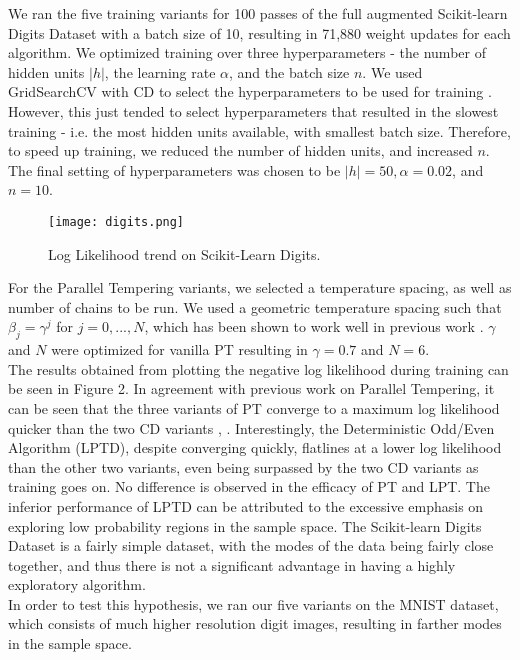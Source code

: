 We ran the five training variants for 100 passes of the full augmented Scikit-learn Digits Dataset with a batch size of 10, resulting in 71,880 weight updates for each algorithm. We optimized training over three hyperparameters - the number of hidden units $|h|$, the learning rate $\alpha$, and the batch size $n$. We used GridSearchCV with CD to select the hyperparameters to be used for training \cite{pedregosa2011scikit}. However, this just tended to select hyperparameters that resulted in the slowest training - i.e. the most hidden units available, with smallest batch size. Therefore, to speed up training, we reduced the number of hidden units, and increased $n$. The final setting of hyperparameters was chosen to be $|h|=50,  \alpha = 0.02$, and $n=10$.\\

\begin{figure}[ht!]
	\centering
	\texttt{[image: digits.png]}
\caption{Log Likelihood trend on Scikit-Learn Digits.}
\end{figure}

For the Parallel Tempering variants, we selected a temperature spacing, as well as number of chains to be run. We used a geometric temperature spacing such that $\beta_j = \gamma^j$  for $j = 0, ..., N$, which has been shown to work well in previous work \cite{kofke2002acceptance}. $\gamma$ and $N$ were optimized for vanilla PT resulting in $\gamma = 0.7$ and $N=6$.\\

The results obtained from plotting the negative log likelihood during training can be seen in Figure 2. In agreement with previous work on Parallel Tempering, it can be seen that the three variants of PT converge to a maximum log likelihood quicker than the two CD variants \cite{desjardins2010tempered}, \cite{fischer2014training}. Interestingly, the Deterministic Odd/Even Algorithm (LPTD), despite converging quickly, flatlines at a lower log likelihood than the other two variants, even being surpassed by the two CD variants as training goes on. No difference is observed in the efficacy of PT and LPT. The inferior performance of LPTD can be attributed to the excessive emphasis on exploring low probability regions in the sample space. The Scikit-learn Digits Dataset is a fairly simple dataset, with the modes of the data being fairly close together, and thus there is not a significant advantage in having a highly exploratory algorithm.\\

In order to test this hypothesis, we ran our five variants on the MNIST dataset, which consists of much higher resolution digit images, resulting in farther modes in the sample space.

